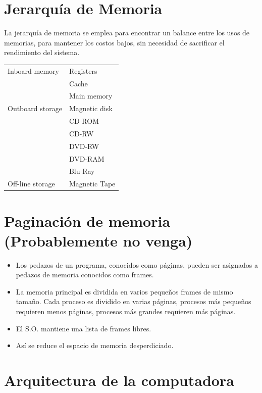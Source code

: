\documentclass[11pt]{article}
\begin{document}
\section{Jerarquía de Memoria}
\label{sec:org3ffa739}
La jerarquía de memoria se emplea para encontrar un balance entre los usos de memorias, para mantener los costos bajos, sin necesidad de sacrificar el rendimiento del sistema.

\begin{center}
\begin{tabular}{|l|l|}
\hline
Inboard memory & Registers\\
 & Cache\\
 & Main memory\\
\hline
Outboard storage & Magnetic disk\\
 & CD-ROM\\
 & CD-RW\\
 & DVD-RW\\
 & DVD-RAM\\
 & Blu-Ray\\
\hline
Off-line storage & Magnetic Tape\\
\hline
\end{tabular}
\end{center}

\section{Paginación de memoria (Probablemente no venga)}
\label{sec:org0286fb4}
\begin{itemize}
\item Los pedazos de un programa, conocidos como páginas, pueden ser asignados a pedazos de memoria conocidos como frames.

\item La memoria principal es dividida en varios pequeños frames de mismo tamaño. Cada proceso es dividido en varias páginas, procesos más pequeños requieren menos páginas, procesos más grandes requieren más páginas.

\item El S.O. mantiene una lista de frames libres.

\item Así se reduce el espacio de memoria desperdiciado.
\end{itemize}

\section{Arquitectura de la computadora}
\label{sec:orge0c0def}
\end{document}
